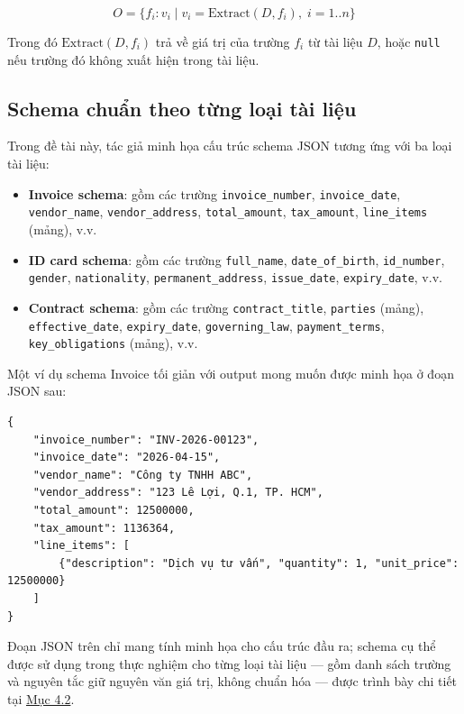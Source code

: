 ﻿\documentclass[12pt]{report}
\begin{document}
\begin{equation}
    O = \{f_i: v_i \mid v_i = \text{Extract}(D, f_i), \; i = 1..n\}
\end{equation}

Trong đó $\text{Extract}(D, f_i)$ trả về giá trị của trường $f_i$ từ tài liệu $D$, hoặc \texttt{null} nếu trường đó không xuất hiện trong tài liệu.

\subsection{Schema chuẩn theo từng loại tài liệu}\label{sec:schemas}

Trong đề tài này, tác giả minh họa cấu trúc schema JSON tương ứng với ba loại tài liệu:

\begin{itemize}
    \item \textbf{Invoice schema}: gồm các trường \texttt{invoice\_number}, \texttt{invoice\_date}, \texttt{vendor\_name}, \texttt{vendor\_address}, \texttt{total\_amount}, \texttt{tax\_amount}, \texttt{line\_items} (mảng), v.v.
    \item \textbf{ID card schema}: gồm các trường \texttt{full\_name}, \texttt{date\_of\_birth}, \texttt{id\_number}, \texttt{gender}, \texttt{nationality}, \texttt{permanent\_address}, \texttt{issue\_date}, \texttt{expiry\_date}, v.v.
    \item \textbf{Contract schema}: gồm các trường \texttt{contract\_title}, \texttt{parties} (mảng), \texttt{effective\_date}, \texttt{expiry\_date}, \texttt{governing\_law}, \texttt{payment\_terms}, \texttt{key\_obligations} (mảng), v.v.
\end{itemize}

Một ví dụ schema Invoice tối giản với output mong muốn được minh họa ở đoạn JSON sau:

\begin{verbatim}
{
    "invoice_number": "INV-2026-00123",
    "invoice_date": "2026-04-15",
    "vendor_name": "Công ty TNHH ABC",
    "vendor_address": "123 Lê Lợi, Q.1, TP. HCM",
    "total_amount": 12500000,
    "tax_amount": 1136364,
    "line_items": [
        {"description": "Dịch vụ tư vấn", "quantity": 1, "unit_price": 12500000}
    ]
}
\end{verbatim}

Đoạn JSON trên chỉ mang tính minh họa cho cấu trúc đầu ra; schema cụ thể được sử dụng trong thực nghiệm cho từng loại tài liệu --- gồm danh sách trường và nguyên tắc giữ nguyên văn giá trị, không chuẩn hóa --- được trình bày chi tiết tại \hyperref[sec:datasets]{Mục 4.2}.
\end{document}
